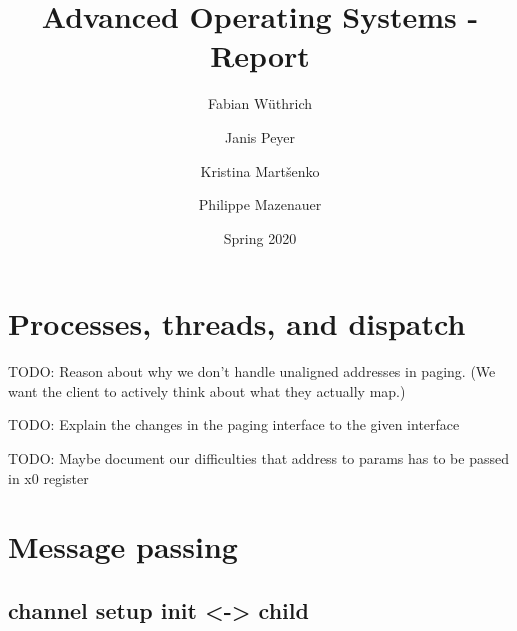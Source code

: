 \documentclass[11pt,a4paper]{report}
\begin{document}
\title{Advanced Operating Systems - Report}
\author{
Fabian W{\" u}thrich
\and
Janis Peyer 
\and
Kristina Mart{\v s}enko
\and
Philippe Mazenauer
}
\date{Spring 2020}

\maketitle

\tableofcontents

\listoffigures

\listoftables

\clearpage



\chapter{Processes, threads, and dispatch}

TODO: Reason about why we don't handle unaligned addresses in paging. (We want the client to actively think about what they actually map.)

TODO: Explain the changes in the paging interface to the given interface

TODO: Maybe document our difficulties that address to params has to be passed in x0 register

\chapter{Message passing}

\section{channel setup init <-> child}
\end{document}
